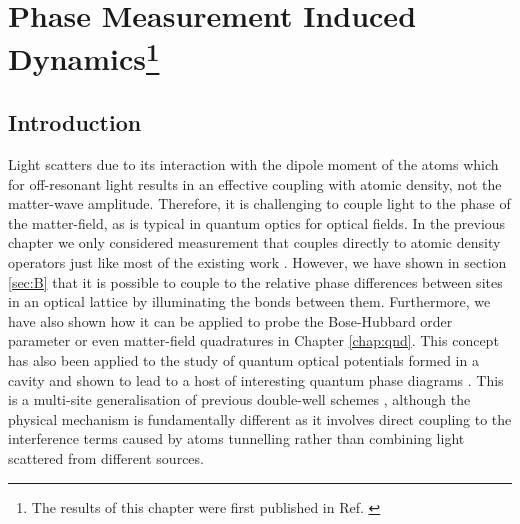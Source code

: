 
\chapter[Phase Measurement Induced Dynamics]
        {Phase Measurement Induced Dynamics\footnote{The results of
            this chapter were first published in
            Ref. \cite{kozlowski2016phase}}}

\ifpdf
    \graphicspath{{Chapter6/Figs/Raster/}{Chapter6/Figs/PDF/}{Chapter6/Figs/}}
\else
    \graphicspath{{Chapter6/Figs/Vector/}{Chapter6/Figs/}}
\fi


\section{Introduction}

Light scatters due to its interaction with the dipole moment of the
atoms which for off-resonant light results in an effective coupling
with atomic density, not the matter-wave amplitude. Therefore, it is
challenging to couple light to the phase of the matter-field, as is
typical in quantum optics for optical fields. In the previous chapter
we only considered measurement that couples directly to atomic density
operators just like most of the existing work \cite{mekhov2012,
  LP2009, rogers2014, ashida2015, ashida2015a}. However, we have shown
in section \ref{sec:B} that it is possible to couple to the relative
phase differences between sites in an optical lattice by illuminating
the bonds between them. Furthermore, we have also shown how it can be
applied to probe the Bose-Hubbard order parameter or even matter-field
quadratures in Chapter \ref{chap:qnd}. This concept has also been
applied to the study of quantum optical potentials formed in a cavity
and shown to lead to a host of interesting quantum phase diagrams
\cite{caballero2015, caballero2015njp, caballero2016,
  caballero2016a}. This is a multi-site generalisation of previous
double-well schemes \cite{cirac1996, castin1997, ruostekoski1997,
  ruostekoski1998, rist2012}, although the physical mechanism is
fundamentally different as it involves direct coupling to the
interference terms caused by atoms tunnelling rather than combining
light scattered from different sources.

